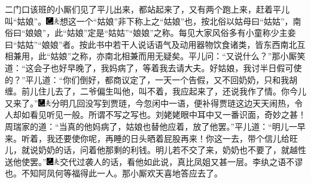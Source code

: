 二门口该班的小厮们见了平儿出来，都站起来了，又有两个跑上来，赶着平儿叫``姑娘''。{\includegraphics[width=3mm]{../Images/00003}\includegraphics[width=3mm]{../Images/00012}\footnotesize \kaishu 想这一个``姑娘''非下称上之``姑娘''也，按北俗以姑母曰``姑姑''，南俗曰``娘娘''，此``姑娘''定是``姑姑''``娘娘''之称。每见大家风俗多有小童称少主妾曰``姑姑''``娘娘''者。按此书中若干人说话语气及动用器物饮食诸类，皆东西南北互相兼用，此``姑娘''之称，亦南北相兼而用无疑矣。}平儿问：``又说什么？''那小厮笑道：``这会子也好早晚了，我妈病了，等着我去请大夫。好姑娘，我讨半日假可使的？''平儿道：``你们倒好，都商议定了，一天一个告假，又不回奶奶，只和我胡缠。前儿住儿去了，二爷偏生叫他，叫不着，我应起来了，还说我作了情。你今儿又来了。''{\includegraphics[width=3mm]{../Images/00003}\includegraphics[width=3mm]{../Images/00012}\footnotesize \kaishu 分明几回没写到贾琏，今忽闲中一语，便补得贾琏这边天天闹热，令人却如看见听见一般。所谓不写之写也。刘姥姥眼中耳中又一番识面，奇妙之甚！}周瑞家的道：``当真的他妈病了，姑娘也替他应着，放了他罢。''平儿道：``明儿一早来。听着，我还要使你呢，再睡的日头晒着屁股再来！你这一去，带个信儿给旺儿，就说奶奶的话，问着他那剩的利钱。明儿若不交了来，奶奶也不要了，就越性送他使罢。''{\includegraphics[width=3mm]{../Images/00003}\includegraphics[width=3mm]{../Images/00012}\footnotesize \kaishu 交代过袭人的话，看他如此说，真比凤姐又甚一层。李纨之语不谬也。不知阿凤何等福得此一人。}那小厮欢天喜地答应去了。

